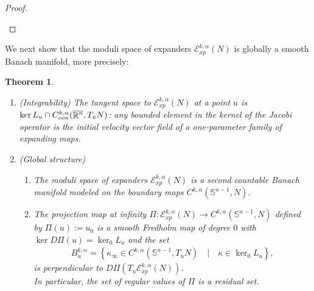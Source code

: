 \documentclass[a4paper,11pt,reqno]{amsart}
\newtheorem{theo}[defn]{Theorem}
\def\R{\mathop{\rm \mathbb{R}}\nolimits}
\newcommand{\Ent}{\mathcal{E}}
\begin{document}
\begin{proof}
\begin{enumerate}
\end{enumerate}
\end{proof}


We next show that the moduli space of expanders $\Ent_{xp}^{k,\alpha}(N)$ is globally a smooth Banach manifold, more precisely:
\begin{theo}\label{theo-glo-str}
\begin{enumerate}
\item (Integrability)\label{item-integ}
The tangent space to $\Ent_{xp}^{k,\alpha}(N)$ at a point $u$ is $\ker L_u\cap C_{con}^{k,\alpha}(\overline{\R^n},T_uN)$: any bounded element in the kernel of the Jacobi operator is the initial velocity vector field of a one-parameter family of expanding maps.\\

\item (Global structure)
\begin{enumerate}
\item \label{item-Mod-spa} The moduli space of expanders $\Ent_{xp}^{k,\alpha}(N)$ is a second countable Banach manifold modeled on the boundary maps $C^{k,\alpha}(\mathbb{S}^{n-1},N)$.\\

\item \label{item-Sard-Smale}The projection map at infinity $\Pi:\Ent_{xp}^{k,\alpha}(N)\rightarrow C^{k,\alpha}(\mathbb{S}^{n-1},N)$ defined by $\Pi(u):=u_0$ is a smooth Fredholm map of degree $0$ with $\ker D\Pi(u)=\ker_0 L_u$ and the set 
\begin{eqnarray}\label{set-inf-def}
B_u^{k,\alpha}=\left\{\kappa_{\infty}\in C^{k,\alpha}(\mathbb{S}^{n-1},T_uN)\quad|\quad\kappa\in\ker_0L_u\right\},
\end{eqnarray}
is perpendicular to $D\Pi(T_u\Ent_{xp}^{k,\alpha}(N))$.\\

In particular, the set of regular values of $\Pi$ is a residual set.


\end{enumerate}



\end{enumerate}




\end{theo}
\end{document}
